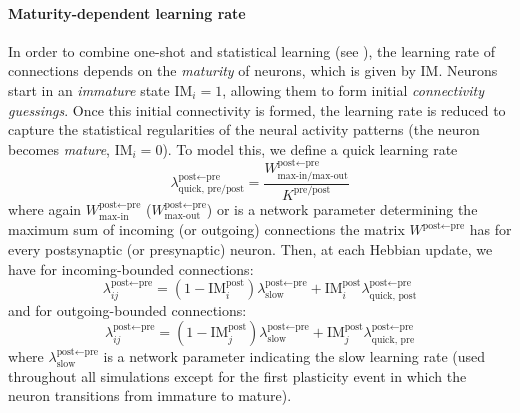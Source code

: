 \documentclass{article}
\begin{document}
\paragraph*{Maturity-dependent learning rate}
In order to combine one-shot and statistical learning (see ), the learning rate of connections depends on the \textit{maturity} of neurons, which is given by $\textrm{IM}$. Neurons start in an \textit{immature} state $\textrm{IM}_i = 1$, allowing them to form initial \textit{connectivity guessings}. Once this initial connectivity is formed, the learning rate is reduced to capture the statistical regularities of the neural activity patterns (the neuron becomes \textit{mature}, $\textrm{IM}_i = 0$). To model this, we define a quick learning rate
\begin{equation}
        \lambda^{\textrm{post}\leftarrow\textrm{pre}}_\textrm{quick, pre/post} = \frac{W^{\textrm{post}\leftarrow\textrm{pre}}_\textrm{max-in/max-out}}{K^\textrm{pre/post}} 
        \label{eq:quick_lambda}
\end{equation}
where again $W^{\textrm{post}\leftarrow\textrm{pre}}_\textrm{max-in}$ ($W^{\textrm{post}\leftarrow\textrm{pre}}_\textrm{max-out}$) or is a network parameter determining the maximum sum of incoming (or outgoing) connections the matrix $W^{\textrm{post}\leftarrow\textrm{pre}}$ has for every postsynaptic (or presynaptic) neuron. Then, at each Hebbian update, we have for incoming-bounded connections:
\begin{equation}
    \lambda_{ij}^{\textrm{post} \leftarrow \textrm{pre}} = (1 - \textrm{IM}^\textrm{post}_i)\lambda^{\textrm{post} \leftarrow \textrm{pre}}_\textrm{slow} + \textrm{IM}^\textrm{post}_i\lambda^{\textrm{post}\leftarrow\textrm{pre}}_\textrm{quick, post}
\end{equation}
and for outgoing-bounded connections:
\begin{equation}
    \lambda_{ij}^{\textrm{post} \leftarrow \textrm{pre}} = (1 - \textrm{IM}^\textrm{post}_j)\lambda^{\textrm{post} \leftarrow \textrm{pre}}_\textrm{slow} + \textrm{IM}^\textrm{post}_j\lambda^{\textrm{post}\leftarrow\textrm{pre}}_\textrm{quick, pre}
\end{equation}
where $\lambda^{\textrm{post} \leftarrow \textrm{pre}}_\textrm{slow}$ is a network parameter indicating the slow learning rate (used throughout all simulations except for the first plasticity event in which the neuron transitions from immature to mature).
\newline\newline
\end{document}
